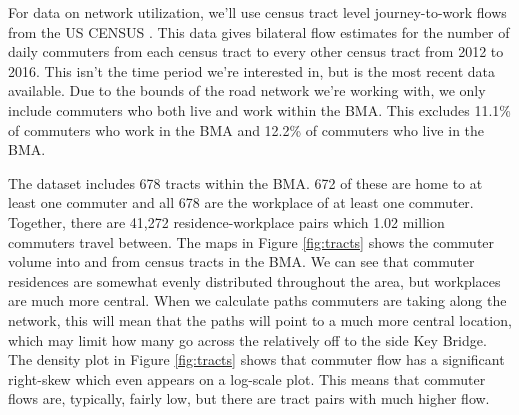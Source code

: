 \documentclass[11pt]{article}
\numberwithin{equation}{section} %
\numberwithin{figure}{section} %
\numberwithin{table}{section} %
\theoremstyle{definition}
\begin{document}
For data on network utilization, we'll use census tract level journey-to-work flows from the US CENSUS \parencite{Bolton20}. This data gives bilateral flow estimates for the number of daily commuters from each census tract to every other census tract from 2012 to 2016. This isn't the time period we're interested in, but is the most recent data available. Due to the bounds of the road network we're working with, we only include commuters who both live and work within the BMA. This excludes 11.1\% of commuters who work in the BMA and 12.2\% of commuters who live in the BMA.

The dataset includes 678 tracts within the BMA. 672 of these are home to at least one commuter and all 678 are the workplace of at least one commuter. Together, there are 41,272 residence-workplace pairs which 1.02 million commuters travel between. The maps in Figure \ref{fig:tracts} shows the commuter volume into and from census tracts in the BMA. We can see that commuter residences are somewhat evenly distributed throughout the area, but workplaces are much more central. When we calculate paths commuters are taking along the network, this will mean that the paths will point to a much more central location, which may limit how many go across the relatively off to the side Key Bridge. The density plot in Figure \ref{fig:tracts} shows that commuter flow has a significant right-skew which even appears on a log-scale plot. This means that commuter flows are, typically, fairly low, but there are tract pairs with much higher flow.
\end{document}
